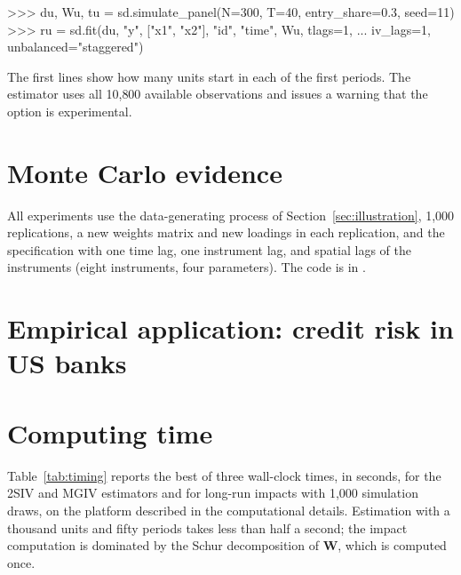 \documentclass[article]{jss}
\begin{document}
\begin{CodeInput}
>>> du, Wu, tu = sd.simulate_panel(N=300, T=40, entry_share=0.3, seed=11)
>>> ru = sd.fit(du, "y", ["x1", "x2"], "id", "time", Wu, tlags=1,
...             iv_lags=1, unbalanced="staggered")
\end{CodeInput}

The first lines show how many units start in each of the first periods. The
estimator uses all 10{,}800 available observations and issues a warning that
the option is experimental.

\section{Monte Carlo evidence} \label{sec:mc}

All experiments use the data-generating process of
Section~\ref{sec:illustration}, 1{,}000 replications, a new weights matrix
and new loadings in each replication, and the specification with one time
lag, one instrument lag, and spatial lags of the instruments (eight
instruments, four parameters). The code is in
.



\section{Empirical application: credit risk in US banks} \label{sec:application}



\section{Computing time} \label{sec:timing}

Table~\ref{tab:timing} reports the best of three wall-clock times, in
seconds, for the 2SIV and MGIV estimators and for long-run impacts with
1{,}000 simulation draws, on the platform described in the computational
details. Estimation with a thousand units and fifty periods takes less than half a second; the impact computation is dominated by the Schur decomposition of $\bm W$, which is computed once.
\end{document}
